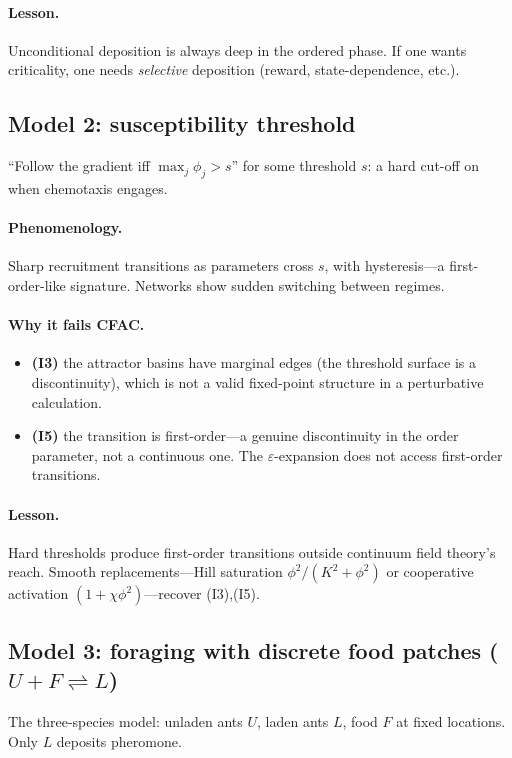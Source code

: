 \documentclass[10pt,a4paper,twocolumn]{article}
\theoremstyle{definition}
\begin{document}
\paragraph{Lesson.}
Unconditional deposition is always deep in the ordered phase.
If one wants criticality, one needs \emph{selective} deposition
(reward, state-dependence, etc.).

\subsection{Model 2: susceptibility threshold}
``Follow the gradient iff $\max_j \phi_j > s$'' for some
threshold $s$: a hard cut-off on when chemotaxis engages.

\paragraph{Phenomenology.}
Sharp recruitment transitions as parameters cross $s$, with
hysteresis---a first-order-like signature.  Networks show sudden
switching between regimes.

\paragraph{Why it fails CFAC.}
\begin{itemize}
  \item \textbf{(I3)} the attractor basins have marginal edges
    (the threshold surface is a discontinuity), which is not a
    valid fixed-point structure in a perturbative calculation.
  \item \textbf{(I5)} the transition is first-order---a genuine
    discontinuity in the order parameter, not a continuous one.
    The $\varepsilon$-expansion does not access first-order
    transitions.
\end{itemize}

\paragraph{Lesson.}
Hard thresholds produce first-order transitions outside
continuum field theory's reach.  Smooth replacements---Hill
saturation $\phi^2/(K^2+\phi^2)$ or cooperative activation
$(1+\chi\phi^2)$---recover (I3),(I5).

\subsection{Model 3: foraging with discrete food patches
  ($U + F \rightleftharpoons L$)}
The three-species model: unladen ants $U$, laden ants $L$, food
$F$ at fixed locations.  Only $L$ deposits pheromone.
\end{document}
